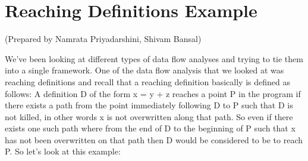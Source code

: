 \clearpage
\section{Reaching Definitions Example}
(Prepared by Namrata Priyadarshini, Shivam Bansal)

We've been looking at different types of data flow analyses and trying to tie them into a single framework. One of the data flow analysis that we looked at was reaching definitions and recall that a reaching definition basically is defined as follows:
A definition D of the form x = y + z reaches a point P in the program if there exists a path from the point immediately following D to P such that D is not killed, in other words x is not overwritten along that path. 
So even if there exists one such path where from the end of D to the beginning of P such that x has not been overwritten on that path then D would be considered to be to reach P. So let's look at this example:

